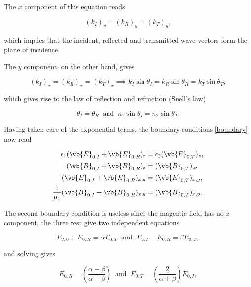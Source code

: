\documentclass[english,a4paper,12pt]{report}
\begin{document}
The \(x\) component of this equation reads 

\begin{equation}
    (k_{I} )_{y} = (k_{R} )_{y} = (k_{T} )_{y},  
\end{equation}

which implies that the incident, reflected and transmitted wave vectors form the plane of incidence. 

The \(y\) component, on the other hand, gives 

\begin{equation}
    (k_{I} )_{x} = (k_{R} )_{x} = (k_{T} )_{x} \implies k_{I}\sin \theta _{I} = k_{R}\sin \theta _{R} = k_{T}\sin \theta _{T},      
\end{equation}

which gives rise to the law of reflection and refraction (Snell's law)

\begin{equation}
    \theta _{I} = \theta _{R} ~\text { and }~ n_{1}\sin \theta _{I} = n_{2}\sin \theta _{T}.      
\end{equation}

Having taken care of the exponential terms, the boundary conditions \cref{boundary} now read

\begin{equation}
    \begin{aligned}
        \epsilon _{1} (\vb{E} _{0,I} + \vb{E} _{0,R} )_{z} &= \epsilon _{2} (\vb{E} _{0,T} )_{z},\\
        ( \vb{B} _{0,I} + \vb{B} _{0,R}  )_{z} &= (\vb{B} _{0,T} )_{z},\\
        (\vb{E} _{0,I} + \vb{E} _{0,R}  )_{x,y} &= (\vb{E} _{0,T} )_{x,y},\\
        \frac{1}{\mu_1} (\vb{B} _{0,I} + \vb{B} _{0,R}   )_{x,y} &= (\vb{B} _{0,T} )_{x,y}.         
    \end{aligned}
\end{equation}

The second boundary condition is useless since the magentic field has no \(z\) component, the three rest give two independent equations

\begin{equation}
    E _{I,0} +  E _{0,R} = \alpha E _{0,T} ~\text { and }~ E _{0,I}-E _{0,R} = \beta E _{0,T},      
\end{equation}

and solving gives 

\begin{equation}
    E _{0,R} = \left( \frac{\alpha -\beta }{\alpha +\beta }  \right) ~\text { and }~ E _{0,T} = \left( \frac{2}{\alpha +\beta }  \right) E_{0,I},
\end{equation}
\end{document}
